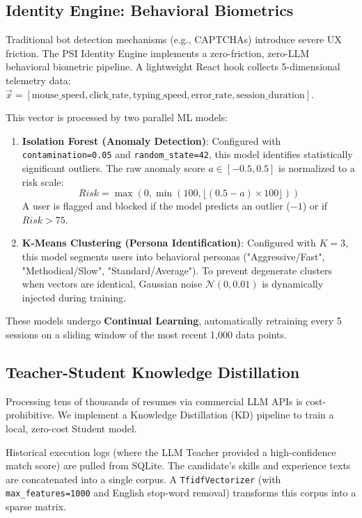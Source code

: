 \documentclass[10pt,journal,compsoc]{IEEEtran}
\begin{document}
\subsection{Identity Engine: Behavioral Biometrics}
Traditional bot detection mechanisms (e.g., CAPTCHAs) introduce severe UX friction. The PSI Identity Engine implements a zero-friction, zero-LLM behavioral biometric pipeline. 
A lightweight React hook collects 5-dimensional telemetry data: $\vec{x} = [\text{mouse\_speed}, \text{click\_rate}, \text{typing\_speed}, \text{error\_rate}, \text{session\_duration}]$.

This vector is processed by two parallel ML models:
\begin{enumerate}
    \item \textbf{Isolation Forest (Anomaly Detection)}: Configured with \texttt{contamination=0.05} and \texttt{random\_state=42}, this model identifies statistically significant outliers. The raw anomaly score $a \in [-0.5, 0.5]$ is normalized to a risk scale:
    \begin{equation}
        Risk = \max(0, \min(100, \lfloor (0.5 - a) \times 100 \rfloor))
    \end{equation}
    A user is flagged and blocked if the model predicts an outlier ($-1$) or if $Risk > 75$.
    \item \textbf{K-Means Clustering (Persona Identification)}: Configured with $K=3$, this model segments users into behavioral personas ("Aggressive/Fast", "Methodical/Slow", "Standard/Average"). To prevent degenerate clusters when vectors are identical, Gaussian noise $\mathcal{N}(0, 0.01)$ is dynamically injected during training.
\end{enumerate}
These models undergo \textbf{Continual Learning}, automatically retraining every 5 sessions on a sliding window of the most recent 1,000 data points.

\subsection{Teacher-Student Knowledge Distillation}
Processing tens of thousands of resumes via commercial LLM APIs is cost-prohibitive. We implement a Knowledge Distillation (KD) pipeline to train a local, zero-cost Student model.

Historical execution logs (where the LLM Teacher provided a high-confidence match score) are pulled from SQLite. The candidate's skills and experience texts are concatenated into a single corpus. A \texttt{TfidfVectorizer} (with \texttt{max\_features=1000} and English stop-word removal) transforms this corpus into a sparse matrix.
\end{document}
